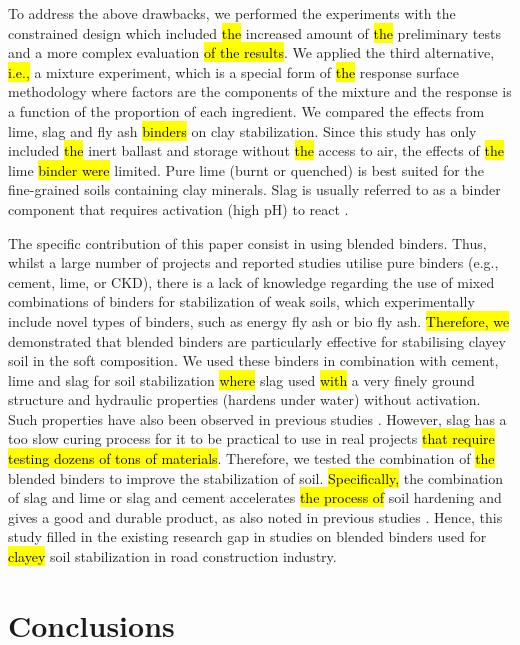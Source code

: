 \documentclass[constrmater,article,submit,pdftex,moreauthors]{Definitions/mdpi}
\begin{document}
To address the above drawbacks, we performed the experiments with the constrained design which included \hl{the} increased amount of \hl{the }preliminary tests and a more complex evaluation \hl{of the results}. We applied the third alternative, \hl{i.e., }a mixture experiment, which is a special form of \hl{the }response surface methodology where factors are the components of the mixture and the response is a function of the proportion of each ingredient. We compared the effects from lime, slag and fly ash \hl{binders} on clay stabilization. Since this study has only included \hl{the }inert ballast and storage without \hl{the} access to air, the effects of \hl{the} lime \hl{binder were} limited. Pure lime (burnt or quenched) is best suited for the fine-grained soils containing clay minerals. Slag is usually referred to as a binder component that requires activation (high pH) to react \citep{Sherwood,Lindh2022a}. 

The specific contribution of this paper consist in using blended binders. Thus, whilst a large number of projects and reported studies utilise pure binders (e.g., cement, lime, or CKD), there is a lack of knowledge regarding the use of mixed combinations of binders for stabilization of weak soils, which experimentally include novel types of binders, such as energy fly ash or bio fly ash. \hl{Therefore, we} demonstrated that blended binders are particularly effective for stabilising clayey soil in the soft composition. We used these binders in combination with cement, lime and slag for soil stabilization\hl{ where }slag used \hl{with} a very finely ground structure and\hl{ }hydraulic properties (hardens under water) without activation. Such properties have also been observed in previous studies \citep{Lindh2000,Lindh2001}. However, slag has a too slow curing process for it to be practical to use in real projects \hl{that require testing dozens of tons of materials}. Therefore, we tested the combination of \hl{the} blended binders to improve the stabilization of soil. \hl{Specifically, }the combination of slag and lime or slag and cement accelerates \hl{the process of }soil hardening and gives a good and durable product, as also noted in previous studies \cite{Lindh2021a}. Hence, this study filled in the existing research gap in studies on blended binders used for \hl{clayey }soil stabilization in road construction industry.

\section{Conclusions}
\end{document}
